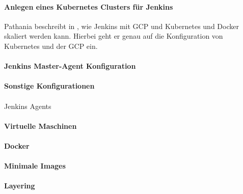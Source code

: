 \paragraph{Anlegen eines Kubernetes Clusters für Jenkins}
Pathania beschreibt in \cite{Pathania2017}, wie Jenkins mit \ac{GCP} und Kubernetes und Docker skaliert werden kann. Hierbei geht er genau auf die Konfiguration von Kubernetes und der \ac{GCP} ein.



\paragraph{Jenkins Master-Agent Konfiguration}


\paragraph{Sonstige Konfigurationen}

\paragraph{}{Jenkins Agents}

\paragraph{Virtuelle Maschinen}

\paragraph{Docker}

\paragraph{Minimale Images}

\paragraph{Layering}
